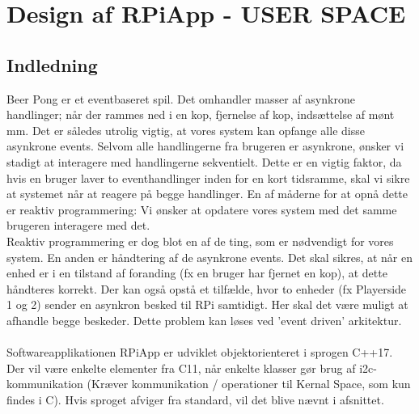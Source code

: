 \documentclass[Softwaredesign/Softwaredesign_main.tex]{subfiles}
\begin{document}
\section{Design af RPiApp - USER SPACE}
\subsection{Indledning}
Beer Pong er et eventbaseret spil. Det omhandler masser af asynkrone handlinger; når der rammes ned i en kop, fjernelse af kop,  indsættelse af mønt mm. Det er således utrolig vigtig, at vores system kan opfange alle disse asynkrone events. Selvom alle handlingerne fra brugeren er asynkrone, ønsker vi stadigt at interagere med handlingerne sekventielt. Dette er en vigtig faktor, da hvis en bruger laver to eventhandlinger inden for en kort tidsramme, skal vi sikre at systemet når at reagere på begge handlinger. En af måderne for at opnå dette er reaktiv programmering: Vi ønsker at opdatere vores system med det samme brugeren interagere med det. 
\\Reaktiv programmering er dog blot en af de ting, som er nødvendigt for vores system. En anden er håndtering af de asynkrone events. Det skal sikres, at når en enhed er i en tilstand af foranding (fx en bruger har fjernet en kop), at dette håndteres korrekt. Der kan også opstå et tilfælde, hvor to enheder (fx Playerside 1 og 2) sender en asynkron besked til RPi samtidigt. Her skal det være muligt at afhandle begge beskeder. Dette problem kan løses ved 'event driven' arkitektur. \\\\
Softwareapplikationen RPiApp er udviklet objektorienteret i sprogen C++17.  Der vil være enkelte elementer fra C11, når enkelte klasser gør brug af i2c-kommunikation (Kræver kommunikation / operationer til Kernal Space, som kun findes i C). Hvis sproget afviger fra standard, vil det blive nævnt i afsnittet.
\end{document}
